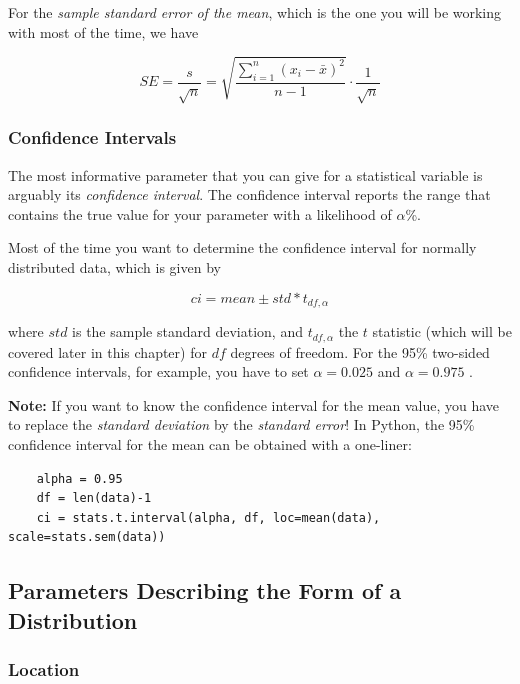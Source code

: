 For the \emph{sample standard error of the mean}, which is the one you will be working with most of the time, we have

\begin{equation}
  SE = \frac{s}{\sqrt{n}} = \sqrt{\frac{{\sum\limits_{i = 1}^n {({x_i-\bar{x}})^2} }}{n-1}} \cdot \frac{1}{\sqrt{n}}
\end{equation}

\subsubsection{Confidence Intervals}
The most informative parameter that you can give for a statistical variable is arguably its \emph{confidence interval}. The confidence interval reports the range that contains the true value for your parameter with a likelihood of $\alpha$\%.

Most of the time you want to determine the confidence interval for normally distributed data, which is given by

\begin{equation}
  ci = mean \pm std * t_{df,\alpha}
\end{equation}\label{eq:ci}

where $std$ is the sample standard deviation, and $t_{df,\alpha}$ the $t$ statistic (which will be covered later in this chapter) for $df$ degrees of freedom. For the 95\% two-sided confidence intervals, for example, you have to set $\alpha=0.025$ and $\alpha=0.975$ .

\textbf{Note:} If you want to know the confidence interval for the mean value, you have to replace the \emph{standard deviation} by the \emph{standard error}! In Python, the 95\% confidence interval for the mean can be obtained with a one-liner:

\begin{lstlisting}
    alpha = 0.95
    df = len(data)-1
    ci = stats.t.interval(alpha, df, loc=mean(data), scale=stats.sem(data))
\end{lstlisting}

\subsection{Parameters Describing the Form of a Distribution}

\subsubsection{Location}

